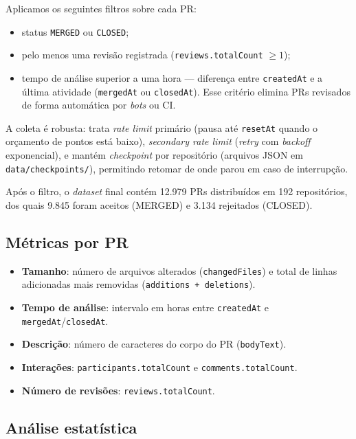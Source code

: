 \documentclass[11pt,a4paper]{article}
\begin{document}
Aplicamos os seguintes filtros sobre cada PR:

\begin{itemize}
  \item status \texttt{MERGED} ou \texttt{CLOSED};
  \item pelo menos uma revis\~ao registrada (\texttt{reviews.totalCount} $\geq 1$);
  \item tempo de an\'alise superior a uma hora --- diferen\c{c}a entre \texttt{createdAt}
        e a \'ultima atividade (\texttt{mergedAt} ou \texttt{closedAt}). Esse crit\'erio
        elimina PRs revisados de forma autom\'atica por \emph{bots} ou CI.
\end{itemize}

A coleta \'e robusta: trata \emph{rate limit} prim\'ario (pausa at\'e \texttt{resetAt}
quando o or\c{c}amento de pontos est\'a baixo), \emph{secondary rate limit} (\emph{retry}
com \emph{backoff} exponencial), e mant\'em \emph{checkpoint} por reposit\'orio (arquivos
JSON em \texttt{data/checkpoints/}), permitindo retomar de onde parou em caso de interrup\c{c}\~ao.

Ap\'os o filtro, o \emph{dataset} final cont\'em 12.979 PRs distribu\'idos em 192
reposit\'orios, dos quais 9.845 foram aceitos (MERGED) e 3.134 rejeitados (CLOSED).

\subsection*{M\'etricas por PR}

\begin{itemize}
  \item \textbf{Tamanho}: n\'umero de arquivos alterados (\texttt{changedFiles}) e total
        de linhas adicionadas mais removidas (\texttt{additions + deletions}).
  \item \textbf{Tempo de an\'alise}: intervalo em horas entre \texttt{createdAt} e
        \texttt{mergedAt}/\texttt{closedAt}.
  \item \textbf{Descri\c{c}\~ao}: n\'umero de caracteres do corpo do PR (\texttt{bodyText}).
  \item \textbf{Intera\c{c}\~oes}: \texttt{participants.totalCount} e
        \texttt{comments.totalCount}.
  \item \textbf{N\'umero de revis\~oes}: \texttt{reviews.totalCount}.
\end{itemize}

\subsection*{An\'alise estat\'istica}
\end{document}
